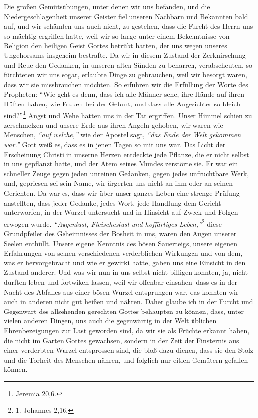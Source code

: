 Die großen Gemütsübungen, unter denen wir uns
befanden,
und die
Niedergeschlagenheit unserer Geister fiel unseren Nachbarn und Bekannten bald
auf, und wir schämten uns auch nicht, zu gestehen, dass die Furcht des Herrn uns
so mächtig ergriffen hatte, weil wir so lange unter einem Bekenntnisse von
Religion den heiligen Geist Gottes betrübt hatten, der uns wegen unseres
Ungehorsams insgeheim bestrafte. Da wir in
diesem
Zustand der Zerknirschung
und Reue den Gedanken, in unseren alten Sünden zu beharren, verabscheuten, so
fürchteten wir uns sogar, erlaubte Dinge zu gebrauchen, weil wir besorgt waren,
dass wir sie missbrauchen möchten. So erfuhren wir die Erfüllung der Worte des
Propheten:
"`Wie geht es denn, dass ich alle Männer sehe, ihre Hände auf ihren
Hüften haben, wie Frauen bei der Geburt, und dass alle Angesichter so bleich
sind?"'\footnote{Jeremia 20,6.}
Angst und Wehe hatten uns in der Tat ergriffen.
Unser Himmel schien zu zerschmelzen und unsere Erde aus ihren Angeln gehoben,
wir waren wie Menschen, \textit{"`auf welche,"'} wie der Apostel sagt,
\textit{"`das Ende der Welt gekommen war."'} Gott weiß es,
dass es in jenen Tagen so mit uns war. Das
Licht der Erscheinung Christi in unserne Herzen entdeckte jede Pflanze, die er
nicht selbst in uns gepflanzt hatte, und der Atem seines Mundes zerstörte sie.
Er war ein schneller Zeuge gegen jeden unreinen
Gedanken, gegen jedes
unfruchtbare Werk, und, gepriesen sei sein Name, wir ärgerten uns nicht an ihm
oder an seinen Gerichten. Da war es, dass wir über unser
ganzes Leben eine
strenge Prüfung anstellten, dass jeder
Gedanke, jedes Wort, jede Handlung dem
Gericht unterworfen, in der Wurzel untersucht und in Hinsicht auf Zweck und
Folgen erwogen wurde.
\textit{"`Augenlust, Fleischeslust und hoffärtiges Leben,"'}\footnote{1.
Johannes 2,16.}
diese Grundpfeiler des Geheimnisses der Bosheit
in uns, waren den Augen unserer Seelen enthüllt. Unsere eigene Kenntnis des
bösen Sauerteigs, unsere eigenen Erfahrungen von seinen
verschiedenen
verderblichen Wirkungen und von dem, was er hervorgebracht und wie er gewirkt
hatte, gaben uns eine Einsicht in den Zustand anderer. Und was wir nun in uns
selbst nicht billigen konnten, ja, nicht durften leben und fortwiken lassen,
weil
wir offenbar einsahen, dass es in der Nacht des Abfalles aus einer bösen Wurzel
entsprungen war, das konnten wir auch in anderen nicht gut heißen und nähren.
Daher glaube ich in der Furcht und Gegenwart des allsehenden gerechten Gottes
behaupten zu können, dass, unter vielen anderen Dingen, uns auch die gegenwärtig
in der Welt üblichen Ehrenbezeigungen zur Last geworden sind, da wir sie als
Früchte erkannt haben, die nicht im Garten Gottes
gewachsen, sondern in der Zeit
der Finsternis aus einer verderbten Wurzel
entsprossen sind, die bloß dazu
dienen, dass sie den Stolz und die Torheit des Menschen nähren, und folglich nur
eitlen Gemütern gefallen können.

